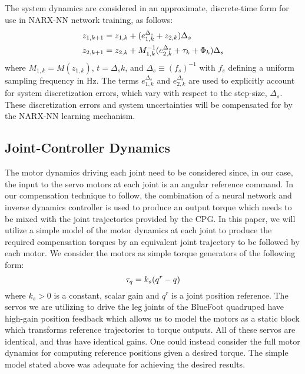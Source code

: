 The system dynamics are considered in an approximate, discrete-time form for use in NARX-NN network training, as follows:
	\begin{equation}
		\vspace{-1.0mm}
		\begin{split}
		{z}_{1,k+1} &= {z}_{1,k} + ( {e}_{1,k}^{\Delta_{s}} + {z}_{2,k} )\Delta_{s} \\
		{z}_{2,k+1} &= {z}_{2,k} + M^{-1}_{1,k}( {e}_{2,k}^{\Delta_{s}} + \tau_{k} + \Phi_{k}) \Delta_{s} \\
		\end{split}
		\label{eq::sampled_dynamics}
	\end{equation}
where $M_{1,k} = M(z_{1,k})$, $t = \Delta_{s} k$, and $\Delta_{s} \equiv (f_{s})^{-1}$ with $f_{s}$ defining a uniform sampling frequency in Hz. The terms ${e}_{1,k}^{\Delta_{s}}$ and ${e}_{2,k}^{\Delta_{s}}$ are used to explicitly account for system discretization errors, which vary with respect to the step-size, $\Delta_{s}$. These discretization errors and system uncertainties will be compensated for by the NARX-NN learning mechanism.


\subsection{Joint-Controller Dynamics}
%
%
The motor dynamics driving each joint need to be considered since, in our case, the input to the servo motors at each joint is an angular reference command. In our compensation technique to follow, the combination of a neural network and inverse dynamics controller is used to produce an output torque which needs to be mixed  with the joint trajectories provided by the CPG. In this paper, we will utilize a simple model of the motor dynamics at each joint to produce the required compensation torques by an equivalent joint trajectory to be followed by each motor. We consider the motors as simple torque generators of the following form:
	\begin{equation}
		\vspace{-1mm}
		\tau_{q} = k_{s}(q^{r}-q)
		\label{eq::servo_control_dynamics}
	\end{equation}
where $k_{s}>0$ is a constant, scalar gain and $q^{r}$ is a joint position reference. The servos we are utilizing to drive the leg joints of the BlueFoot quadruped have high-gain position feedback which allows us to model the motors as a static block which transforms reference trajectories to torque outputs. All of these servos are identical, and thus have identical gains. One could instead consider the full motor dynamics for computing reference positions given a desired torque. The simple model stated above was adequate for achieving the desired results.
